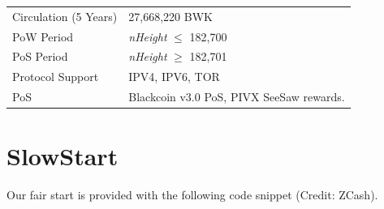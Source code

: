 \documentclass[11pt,a4paperpaper,]{report}
\begin{document}
\begin{longtable}[]{@{}ll@{}}
\begin{minipage}[t]{0.35\columnwidth}\raggedright\strut
Circulation (5 Years)\strut
\end{minipage} & \begin{minipage}[t]{0.59\columnwidth}\raggedright\strut
27,668,220 BWK\strut
\end{minipage}\tabularnewline
\begin{minipage}[t]{0.35\columnwidth}\raggedright\strut
PoW Period\strut
\end{minipage} & \begin{minipage}[t]{0.59\columnwidth}\raggedright\strut
\textit{nHeight} \(\leq\) 182,700\strut
\end{minipage}\tabularnewline
\begin{minipage}[t]{0.35\columnwidth}\raggedright\strut
PoS Period\strut
\end{minipage} & \begin{minipage}[t]{0.59\columnwidth}\raggedright\strut
\textit{nHeight} \(\geq\) 182,701\strut
\end{minipage}\tabularnewline
\begin{minipage}[t]{0.35\columnwidth}\raggedright\strut
Protocol Support\strut
\end{minipage} & \begin{minipage}[t]{0.59\columnwidth}\raggedright\strut
IPV4, IPV6, TOR\strut
\end{minipage}\tabularnewline
\begin{minipage}[t]{0.35\columnwidth}\raggedright\strut
PoS\strut
\end{minipage} & \begin{minipage}[t]{0.59\columnwidth}\raggedright\strut
Blackcoin v3.0 PoS, PIVX SeeSaw rewards.\strut
\end{minipage}\tabularnewline
\bottomrule
\end{longtable}

\newpage

\section{SlowStart}\label{slowstart}

Our fair start is provided with the following code snippet (Credit:
ZCash).
\end{document}
